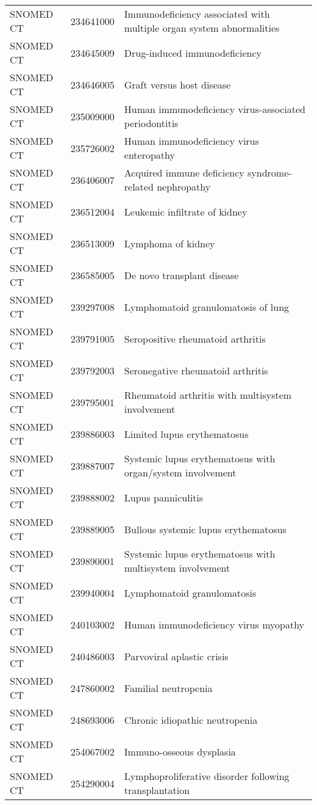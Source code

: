 \begin{longtable}{p{}p{}p{}}
  SNOMED CT & 234641000 & Immunodeficiency associated with multiple organ system abnormalities \\ 
  SNOMED CT & 234645009 & Drug-induced immunodeficiency \\ 
  SNOMED CT & 234646005 & Graft versus host disease \\ 
  SNOMED CT & 235009000 & Human immunodeficiency virus-associated periodontitis \\ 
  SNOMED CT & 235726002 & Human immunodeficiency virus enteropathy \\ 
  SNOMED CT & 236406007 & Acquired immune deficiency syndrome-related nephropathy \\ 
  SNOMED CT & 236512004 & Leukemic infiltrate of kidney \\ 
  SNOMED CT & 236513009 & Lymphoma of kidney \\ 
  SNOMED CT & 236585005 & De novo transplant disease \\ 
  SNOMED CT & 239297008 & Lymphomatoid granulomatosis of lung \\ 
  SNOMED CT & 239791005 & Seropositive rheumatoid arthritis \\ 
  SNOMED CT & 239792003 & Seronegative rheumatoid arthritis \\ 
  SNOMED CT & 239795001 & Rheumatoid arthritis with multisystem involvement \\ 
  SNOMED CT & 239886003 & Limited lupus erythematosus \\ 
  SNOMED CT & 239887007 & Systemic lupus erythematosus with organ/system involvement \\ 
  SNOMED CT & 239888002 & Lupus panniculitis \\ 
  SNOMED CT & 239889005 & Bullous systemic lupus erythematosus \\ 
  SNOMED CT & 239890001 & Systemic lupus erythematosus with multisystem involvement \\ 
  SNOMED CT & 239940004 & Lymphomatoid granulomatosis \\ 
  SNOMED CT & 240103002 & Human immunodeficiency virus myopathy \\ 
  SNOMED CT & 240486003 & Parvoviral aplastic crisis \\ 
  SNOMED CT & 247860002 & Familial neutropenia \\ 
  SNOMED CT & 248693006 & Chronic idiopathic neutropenia \\ 
  SNOMED CT & 254067002 & Immuno-osseous dysplasia \\ 
  SNOMED CT & 254290004 & Lymphoproliferative disorder following transplantation \\ 

\end{longtable}
